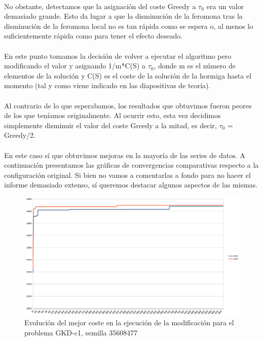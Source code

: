 	\paragraph{}No obstante, detectamos que la asignación del coste Greedy a $\tau_{0}$ era un valor demasiado grande. Esto da lugar a que la disminución de la feromona tras la disminución de la feromona local no es tan rápida como se espera o, al menos lo suficientemente rápida como para tener el efecto deseado.
	
	\paragraph{}En este punto tomamos la decisión de volver a ejecutar el algoritmo pero modificando el valor y asignando 1/m*C(S) a $\tau_{0}$, donde m es el número de elementos de la solución y C(S) es el coste de la solución de la hormiga hasta el momento (tal y como viene indicado en las diapositivas de teoría).
	
	\paragraph{}Al contrario de lo que esperabamos, los resultados que obtuvimos fueron peores de los que teníamos originalmente. Al ocurrir esto, esta vez decidimos simplemente disminuir el valor del coste Greedy a la mitad, es decir,  $\tau_{0}$ = Greedy/2.
	
	\paragraph{}En este caso sí que obtuvimos mejoras en la mayoría de las series de datos. A continuación presentamos las gráficas de convergencias comparativas respecto a la configuración original. Si bien no vamos a comentarlas a fondo para no hacer el informe demasiado extenso, sí queremos destacar algunos aspectos de las mismas.
	
	\begin{figure}[H]
		\centering
		\includegraphics[scale=0.3]{img/convergenciaGKD1mejora.png}
		\caption{Evolución del mejor coste en la ejecución de la modificación para el problema GKD-c1, semilla 35608477}
		\label{gkd-c1_convergencia_mejora}
	\end{figure}

